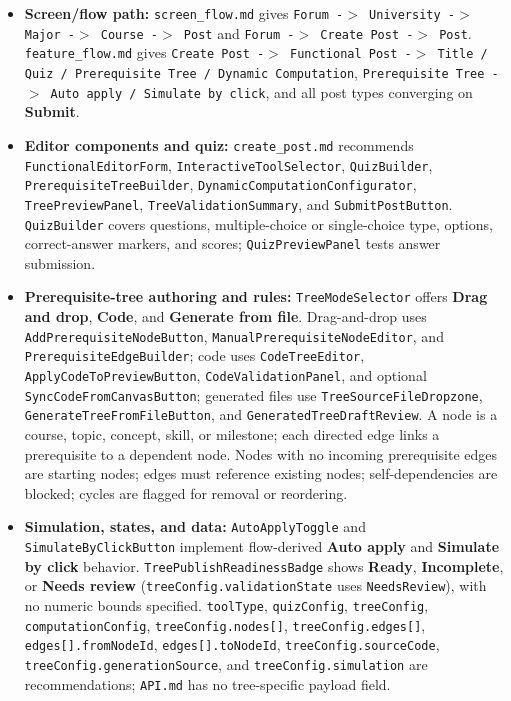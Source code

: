 \documentclass[12pt]{article}
\begin{document}
\begin{itemize}
\item \textbf{Screen/flow path:} \texttt{screen\_flow.md} gives \texttt{Forum -$>$ University -$>$ Major -$>$ Course -$>$ Post} and \texttt{Forum -$>$ Create Post -$>$ Post}. \texttt{feature\_flow.md} gives \texttt{Create Post -$>$ Functional Post -$>$ Title / Quiz / Prerequisite Tree / Dynamic Computation}, \texttt{Prerequisite Tree -$>$ Auto apply / Simulate by click}, and all post types converging on \textbf{Submit}.
\item \textbf{Editor components and quiz:} \texttt{create\_post.md} recommends \texttt{FunctionalEditorForm}, \texttt{InteractiveToolSelector}, \texttt{QuizBuilder}, \texttt{PrerequisiteTreeBuilder}, \texttt{DynamicComputationConfigurator}, \texttt{TreePreviewPanel}, \texttt{TreeValidationSummary}, and \texttt{SubmitPostButton}. \texttt{QuizBuilder} covers questions, multiple-choice or single-choice type, options, correct-answer markers, and scores; \texttt{QuizPreviewPanel} tests answer submission.
\item \textbf{Prerequisite-tree authoring and rules:} \texttt{TreeModeSelector} offers \textbf{Drag and drop}, \textbf{Code}, and \textbf{Generate from file}. Drag-and-drop uses \texttt{AddPrerequisiteNodeButton}, \texttt{ManualPrerequisiteNodeEditor}, and \texttt{PrerequisiteEdgeBuilder}; code uses \texttt{CodeTreeEditor}, \texttt{ApplyCodeToPreviewButton}, \texttt{CodeValidationPanel}, and optional \texttt{SyncCodeFromCanvasButton}; generated files use \texttt{TreeSourceFileDropzone}, \texttt{GenerateTreeFromFileButton}, and \texttt{GeneratedTreeDraftReview}. A node is a course, topic, concept, skill, or milestone; each directed edge links a prerequisite to a dependent node. Nodes with no incoming prerequisite edges are starting nodes; edges must reference existing nodes; self-dependencies are blocked; cycles are flagged for removal or reordering.
\item \textbf{Simulation, states, and data:} \texttt{AutoApplyToggle} and \texttt{SimulateByClickButton} implement flow-derived \textbf{Auto apply} and \textbf{Simulate by click} behavior. \texttt{TreePublishReadinessBadge} shows \textbf{Ready}, \textbf{Incomplete}, or \textbf{Needs review} (\texttt{treeConfig.validationState} uses \texttt{NeedsReview}), with no numeric bounds specified. \texttt{toolType}, \texttt{quizConfig}, \texttt{treeConfig}, \texttt{computationConfig}, \texttt{treeConfig.nodes[]}, \texttt{treeConfig.edges[]}, \texttt{edges[].fromNodeId}, \texttt{edges[].toNodeId}, \texttt{treeConfig.sourceCode}, \texttt{treeConfig.generationSource}, and \texttt{treeConfig.simulation} are recommendations; \texttt{API.md} has no tree-specific payload field.

\end{itemize}
\end{document}

